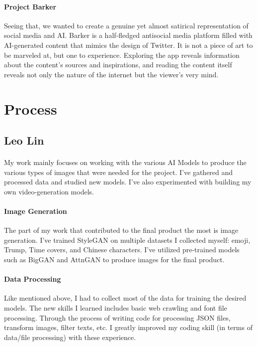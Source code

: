 \documentclass[12pt, letterpaper]{article}
\begin{document}
\paragraph{Project Barker}Seeing that, we wanted to create a genuine yet almost satirical representation of social media and AI. Barker is a half-fledged antisocial media platform filled with AI-generated content that mimics the design of Twitter. It is not a piece of art to be marveled at, but one to experience. Exploring the app reveals information about the content’s sources and inspirations, and reading the content itself reveals not only the nature of the internet but the viewer’s very mind.

\section{Process}

\subsection{Leo Lin}

\paragraph{}My work mainly focuses on working with the various AI Models to produce the various types of images that were needed for the project. I've gathered and processed data and studied new models. I've also experimented with building my own video-generation models.

\paragraph{Image Generation}The part of my work that contributed to the final product the most is image generation. I've trained StyleGAN on multiple datasets I collected myself: emoji, Trump, Time covers, and Chinese characters. I've utilized pre-trained models such as BigGAN and AttnGAN to produce images for the final product. 

\paragraph{Data Processing}Like mentioned above, I had to collect most of the data for training the desired models. The new skills I learned includes basic web crawling and font file processing. Through the process of writing code for processing JSON files, transform images, filter texts, etc. I greatly improved my coding skill (in terms of data/file processing) with these experience.
\end{document}
